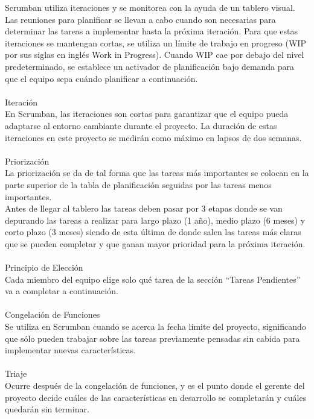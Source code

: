 \documentclass[12pt, a4paper, titlepage]{report}
\begin{document}
	    Scrumban utiliza iteraciones y se monitorea con la ayuda de un tablero visual. Las reuniones para planificar se llevan a cabo cuando son necesarias para determinar las tareas a implementar hasta la próxima iteración. Para que estas iteraciones se mantengan cortas, se utiliza un límite de trabajo en progreso (WIP por sus siglas en inglés Work in Progress). Cuando WIP cae por debajo del nivel predeterminado, se establece un activador de planificación bajo demanda para que el equipo sepa cuándo planificar a continuación.\\
	    \\
	    Iteración\\
	    En Scrumban, las iteraciones son cortas para garantizar que el equipo pueda adaptarse al entorno cambiante durante el proyecto. La duración de estas iteraciones en este proyecto se medirán como máximo en lapsos de dos semanas.\\
	    \\
	    Priorización\\
	    La priorización se da de tal forma que las tareas más importantes se colocan en la parte superior de la tabla de planificación seguidas por las tareas menos importantes.\\
	    Antes de llegar al tablero las tareas deben pasar por 3 etapas donde se van depurando las tareas a realizar para largo plazo (1 año), medio plazo (6 meses) y corto plazo (3 meses) siendo de esta última de donde salen las tareas más claras que se pueden completar y que ganan mayor prioridad para la próxima iteración.\\
	    \\
	    Principio de Elección\\
	    Cada miembro del equipo elige solo qué tarea de la sección “Tareas Pendientes” va a completar a continuación.\\
	    \\
	    Congelación de Funciones\\
	    Se utiliza en Scrumban cuando se acerca la fecha límite del proyecto, significando que sólo pueden trabajar sobre las tareas previamente pensadas sin cabida para implementar nuevas características.\\
	    \\
	    Triaje\\
	    Ocurre después de la congelación de funciones, y es el punto donde el gerente del proyecto decide cuáles de las características en desarrollo se completarán y cuáles quedarán sin terminar.\\
	    
\end{document}
